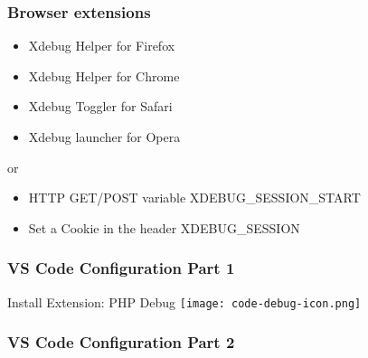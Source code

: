 \begin{frame}\frametitle{Browser extensions}
    \begin{itemize}
        \item Xdebug Helper for Firefox
        \item Xdebug Helper for Chrome
        \item Xdebug Toggler for Safari
        \item Xdebug launcher for Opera 
    \end{itemize} \pause
    or
    \begin{itemize}
        \item HTTP GET/POST variable XDEBUG\_SESSION\_START
        \item Set a Cookie in the header XDEBUG\_SESSION
    \end{itemize}
\end{frame}

\begin{frame}\frametitle{VS Code Configuration Part 1}
    Install Extension: PHP Debug \pause \texttt{[image: code-debug-icon.png]} \pause
    
\end{frame}

\begin{frame}\frametitle{VS Code Configuration Part 2}
    
\end{frame}